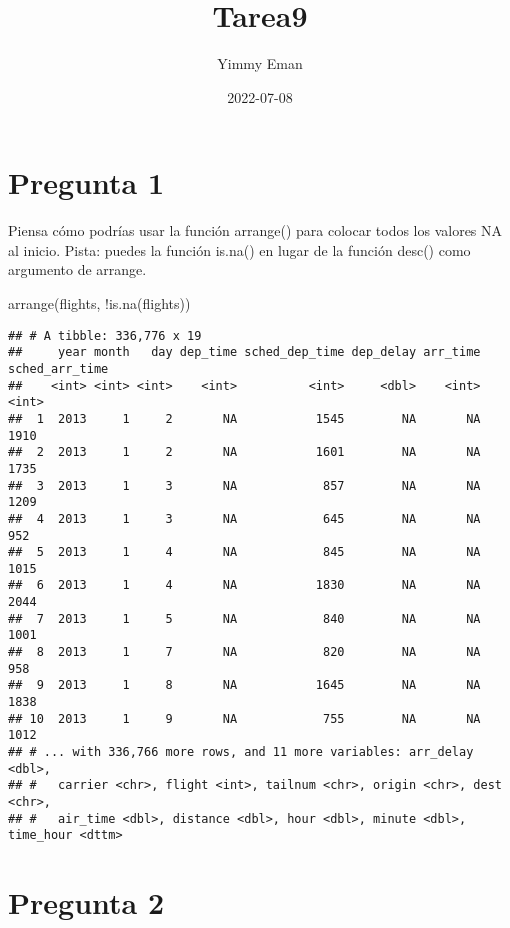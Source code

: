 \documentclass[
]{article}
\title{Tarea9}
\author{Yimmy Eman}
\date{2022-07-08}
\newenvironment{Shaded}{\begin{snugshade}}{\end{snugshade}}
\newcommand{\FunctionTok}[1]{\textcolor[rgb]{0.00,0.00,0.00}{#1}}
\newcommand{\NormalTok}[1]{#1}
\newcommand{\SpecialCharTok}[1]{\textcolor[rgb]{0.00,0.00,0.00}{#1}}
\begin{document}
\maketitle

\hypertarget{pregunta-1}{%
\section{Pregunta 1}\label{pregunta-1}}

Piensa cómo podrías usar la función arrange() para colocar todos los
valores NA al inicio. Pista: puedes la función is.na() en lugar de la
función desc() como argumento de arrange.

\begin{Shaded}
\begin{Highlighting}[]
\FunctionTok{arrange}\NormalTok{(flights, }\SpecialCharTok{!}\FunctionTok{is.na}\NormalTok{(flights))}
\end{Highlighting}
\end{Shaded}

\begin{verbatim}
## # A tibble: 336,776 x 19
##     year month   day dep_time sched_dep_time dep_delay arr_time sched_arr_time
##    <int> <int> <int>    <int>          <int>     <dbl>    <int>          <int>
##  1  2013     1     2       NA           1545        NA       NA           1910
##  2  2013     1     2       NA           1601        NA       NA           1735
##  3  2013     1     3       NA            857        NA       NA           1209
##  4  2013     1     3       NA            645        NA       NA            952
##  5  2013     1     4       NA            845        NA       NA           1015
##  6  2013     1     4       NA           1830        NA       NA           2044
##  7  2013     1     5       NA            840        NA       NA           1001
##  8  2013     1     7       NA            820        NA       NA            958
##  9  2013     1     8       NA           1645        NA       NA           1838
## 10  2013     1     9       NA            755        NA       NA           1012
## # ... with 336,766 more rows, and 11 more variables: arr_delay <dbl>,
## #   carrier <chr>, flight <int>, tailnum <chr>, origin <chr>, dest <chr>,
## #   air_time <dbl>, distance <dbl>, hour <dbl>, minute <dbl>, time_hour <dttm>
\end{verbatim}

\hypertarget{pregunta-2}{%
\section{Pregunta 2}\label{pregunta-2}}
\end{document}
